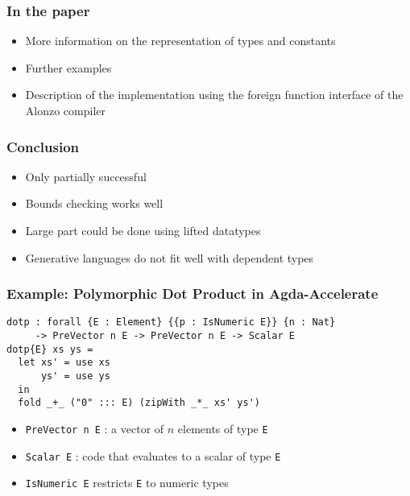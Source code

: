 \documentclass{beamer}
\begin{document}
\begin{frame}
  \frametitle{In the paper}
  \begin{itemize}
  \item More information on the representation of types and constants
  \item Further examples
  \item Description of the implementation using the foreign function
    interface of the Alonzo compiler
  \end{itemize}
\end{frame}

\begin{frame}
  \frametitle{Conclusion}
  \begin{itemize}
  \item Only partially successful
  \item Bounds checking works well
  \item Large part could be done using lifted datatypes
  \item Generative languages do not fit well with dependent types
  \end{itemize}
\end{frame}

\begin{frame}[fragile]
  \frametitle{Example: Polymorphic Dot Product in Agda-Accelerate}
  \vspace{-\baselineskip}
\begin{verbatim}
dotp : forall {E : Element} {{p : IsNumeric E}} {n : Nat}
     -> PreVector n E -> PreVector n E -> Scalar E
dotp{E} xs ys = 
  let xs' = use xs
      ys' = use ys
  in
  fold _+_ ("0" ::: E) (zipWith _*_ xs' ys')
\end{verbatim}
  \begin{itemize}
  \item \texttt{PreVector n E} : a vector of $n$ elements of
    type \texttt{E}
  \item \texttt{Scalar E} : code that evaluates to a scalar of type \texttt{E}
  \item \texttt{IsNumeric E} restricts \texttt{E} to numeric types
  \end{itemize}
\end{frame}
\end{document}
